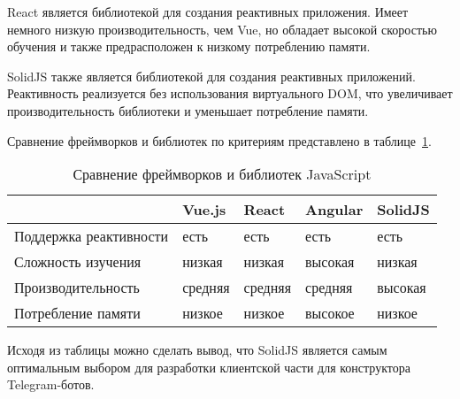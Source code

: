 React является библиотекой для создания реактивных приложения.
Имеет немного низкую производительность, чем Vue, но обладает высокой
скоростью обучения и также предрасположен к низкому потреблению памяти.

SolidJS также является библиотекой для создания реактивных
приложений. Реактивность реализуется без использования виртуального
DOM, что увеличивает производительность библиотеки и уменьшает
потребление памяти.

Сравнение фреймворков и библиотек по критериям представлено в
таблице~\ref{t:comp-client-lib}.


\begin{table}[ht]
	\Large
	\caption{Сравнение фреймворков и библиотек JavaScript}
	\label{t:comp-client-lib}
	\centering
	\begin{tabularx}{\textwidth}
		{|>{}X
		|>{\centering\arraybackslash}X
		|>{\centering\arraybackslash}X
		|>{\centering\arraybackslash}X
		|>{\centering\arraybackslash}X|}
		\hline
		        &
		Vue.js  &
		React   &
		Angular &
		SolidJS                                         \\
		\hline
		Поддержка
		реактивности
		        & есть    & есть    & есть    & есть    \\
		\hline
		Сложность изучения
		        & низкая  & низкая  & высокая & низкая  \\
		\hline
		Про\-из\-во\-ди\-тель\-ность
		        & средняя & средняя & средняя & высокая \\
		\hline
		Потребление памяти
		        & низкое  & низкое  & высокое & низкое  \\
		\hline
	\end{tabularx}
	\vspace{\bottompaddingoftable}
\end{table}



Исходя из таблицы можно сделать вывод, что SolidJS является самым
оптимальным выбором для разработки клиентской части для конструктора
Telegram-ботов.
